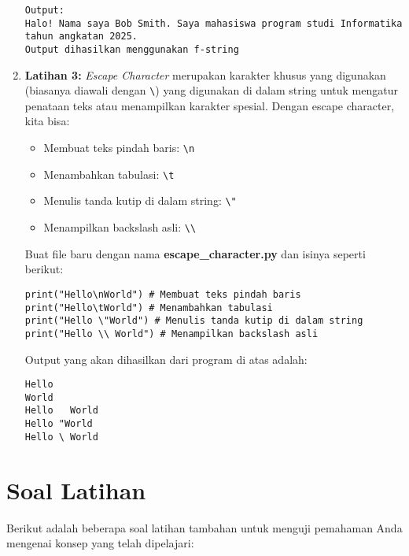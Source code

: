 \begin{enumerate}
\begin{verbatim}
Output:
Halo! Nama saya Bob Smith. Saya mahasiswa program studi Informatika tahun angkatan 2025. 
Output dihasilkan menggunakan f-string
\end{verbatim}

\item \textbf{Latihan 3:} \textit{Escape Character} merupakan karakter khusus yang digunakan (biasanya diawali dengan \texttt{\textbackslash}) yang digunakan di dalam string untuk mengatur penataan teks atau menampilkan karakter spesial. Dengan escape character, kita bisa:

\begin{itemize}
    \item Membuat teks pindah baris: \texttt{\textbackslash n}
    \item Menambahkan tabulasi: \texttt{\textbackslash t}
    \item Menulis tanda kutip di dalam string: \texttt{\textbackslash "}
    \item Menampilkan backslash asli: \texttt{\textbackslash\textbackslash}
\end{itemize}

Buat file baru dengan nama \textbf{escape_character.py} dan isinya seperti berikut:

\begin{lstlisting}[style=PythonStyle, caption={Latihan 3}]
print("Hello\nWorld") # Membuat teks pindah baris
print("Hello\tWorld") # Menambahkan tabulasi
print("Hello \"World") # Menulis tanda kutip di dalam string
print("Hello \\ World") # Menampilkan backslash asli
\end{lstlisting}

Output yang akan dihasilkan dari program di atas adalah:

\begin{verbatim}
Hello
World
Hello	World
Hello "World
Hello \ World
\end{verbatim}
\end{enumerate}

\section{Soal Latihan}

Berikut adalah beberapa soal latihan tambahan untuk menguji pemahaman Anda mengenai konsep yang telah dipelajari:

